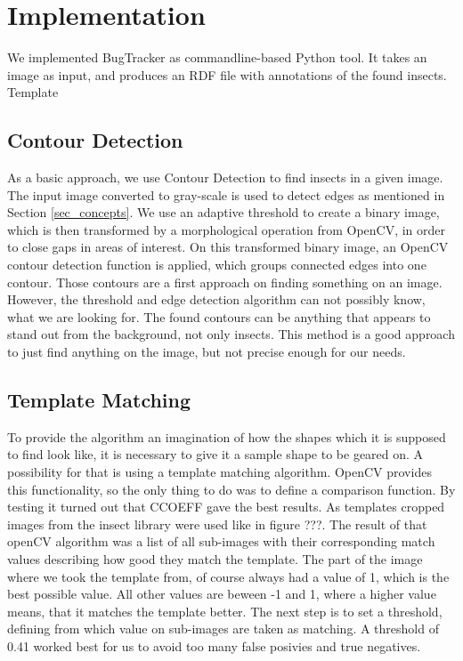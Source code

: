 \section{Implementation}
\label{sec_implementation}

We implemented BugTracker as commandline-based Python tool.
It takes an image as input, and produces an RDF file with annotations of the found insects.
Template

\subsection{Contour Detection}
As a basic approach, we use Contour Detection to find insects in a given image.
The input image converted to gray-scale is used to detect edges as mentioned in Section \ref{sec_concepts}.
We use an adaptive threshold to create a binary image, which is then transformed by a morphological operation from OpenCV, in order to close gaps in areas of interest.
On this transformed binary image, an OpenCV contour detection function is applied, which groups connected edges into one contour.
Those contours are a first approach on finding something on an image.
However, the threshold and edge detection algorithm can not possibly know, what we are looking for.
The found contours can be anything that appears to stand out from the background, not only insects.
This method is a good approach to just find anything on the image, but not precise enough for our needs.


\subsection{Template Matching}
To provide the algorithm an imagination of how the shapes which it is supposed to find look like, it is necessary to give it a sample shape to be geared on.
A possibility for that is using a template matching algorithm.
OpenCV provides this functionality, so the only thing to do was to define a comparison function.
By testing it turned out that CCOEFF gave the best results.
As templates cropped images from the insect library were used like in figure ???.
The result of that openCV algorithm was a list of all sub-images with their corresponding match values describing how good they match the template.
The part of the image where we took the template from, of course always had a value of 1, which is the best possible value.
All other values are beween -1 and 1, where a higher value means, that it matches the template better.
The next step is to set a threshold, defining from which value on sub-images are taken as matching.
A threshold of 0.41 worked best for us to avoid too many false posivies and true negatives.

